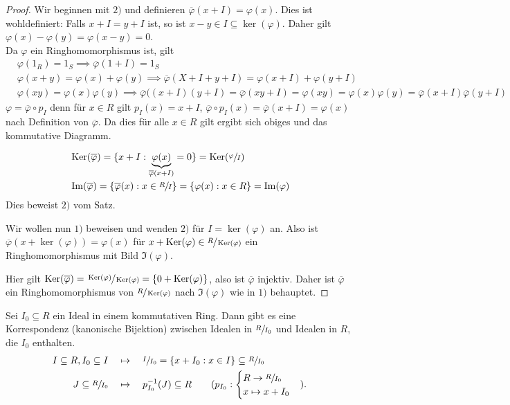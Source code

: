 \begin{proof}
	Wir beginnen mit $2)$ und definieren $\overline{\varphi}(x+I) = \varphi(x)$.
	Dies ist wohldefiniert: Falls $x + I = y + I $ ist, so ist $x-y \in I \subseteq \ker(\varphi)$.
	Daher gilt $\varphi(x) - \varphi(y) = \varphi(x-y) = 0$.\\
	Da $\varphi$ ein Ringhomomorphismus ist, gilt
	\begin{align*}
		&\varphi(1_{R}) = 1_{S} \implies \overline{\varphi}(1+I) = 1_{S}\\
		&\varphi(x+y) = \varphi(x) + \varphi(y) \implies \overline{\varphi}(X+I + y + I) = \varphi(x+I) + \varphi(y+I)\\
		&\varphi(xy) = \varphi(x) \varphi(y) \implies \overline{\varphi}((x+I)(y+I) = \overline{\varphi}(xy+I) = \varphi(xy) = \varphi(x)\varphi(y) = \overline{\varphi}(x+I)
		\overline{\varphi}(y+I)
	\end{align*}
	$\varphi = \overline{\varphi} \circ p_{I}$ denn für $x \in R$ gilt $p_{I}(x) = x + I$,
	$\overline{\varphi} \circ p_{I}(x) = \overline{\varphi}(x+I) = \varphi(x)$ nach Definition von $\overline{\varphi}$.
	Da dies für alle $x \in R$ gilt ergibt sich obiges und das kommutative Diagramm.

	\begin{align*}
		&\operatorname{Ker}(\overline{\varphi}) = \{x+I: \underbrace{\varphi(x)}_{\overline{\varphi}(x+I)} = 0\} = \operatorname{Ker}(\sfrac{\varphi}{I})\\
		&\Im(\overline{\varphi}) = \{\overline{\varphi}(x): x \in \sfrac{R}{I}\} =\{\varphi(x): x \in R\} = \Im(\varphi)
	\end{align*}
	Dies beweist $2)$ vom Satz.

	Wir wollen nun $1)$ beweisen und wenden $2)$ für $I = \ker(\varphi)$ an.
	Also ist $\overline{\varphi}(x+\ker(\varphi)) = \varphi(x)$ für $x + \operatorname{Ker}(\varphi) \in \sfrac{R}{\operatorname{Ker}(\varphi)}$ 
	ein Ringhomomorphismus mit Bild $\Im(\varphi)$.

	Hier gilt $\operatorname{Ker}(\overline{\varphi}) = \sfrac{\operatorname{Ker}(\varphi)}{\operatorname{Ker}(\varphi)} = \{0 + \operatorname{Ker}(\varphi)\} $, also ist $\overline{\varphi}$ injektiv.
	Daher ist $\overline{\varphi}$ ein Ringhomomorphismus von $\sfrac{R}{\operatorname{Ker}(\varphi)}$ nach $\Im(\varphi)$ wie in $1)$ behauptet.
\end{proof}

\begin{remark}
	Sei $I_{0} \subseteq R$ ein Ideal in einem kommutativen Ring.
	Dann gibt es eine Korrespondenz (kanonische Bijektion) zwischen Idealen in $\sfrac{R}{I_{0}}$ und Idealen in $R$, die $I_0$ enthalten.
	\begin{align*}
		I \subseteq R, I_0 \subseteq I \quad &\mapsto \quad \sfrac{I}{I_0} = \{x+ I_0: x \in I\} \subseteq \sfrac{R}{I_0}\\
		J \subseteq \sfrac{R}{I_0} \quad &\mapsto \quad p_{I_0}^{-1}(J) \subseteq R \qquad (p_{I_0}: \begin{cases}
			R \to \sfrac{R}{I_0}\\
			x \mapsto x + I_0
		\end{cases})
	.\end{align*}
\end{remark}

